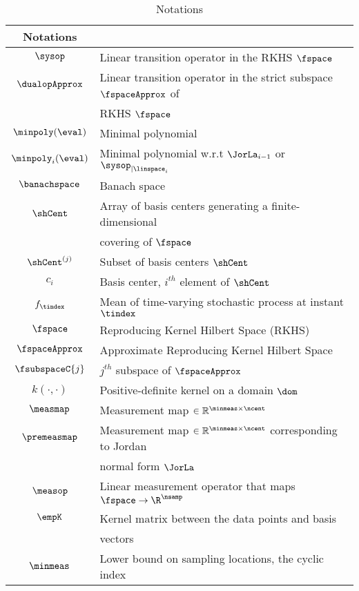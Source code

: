\begin{table}[tbh]\label{table:notation}
	\centering
	\caption{Notations}
	\label{tab}
\begin{tabular}{ cl  }
	\hline
	Notations & \\
	\hline
	$ \sysop $ & Linear transition operator in the RKHS $ \fspace $ \\
	$ \dualopApprox $ & Linear transition operator in the strict subspace $ \fspaceApprox $ of \\
	 & RKHS $ \fspace $ \\
	$ \minpoly(\eval) $ & Minimal polynomial\\ 
	$ \minpoly_i(\eval) $ & Minimal polynomial w.r.t $ \JorLa_{i-1} $ or $ \sysop_{|\linspace_i} $\\
	$\banachspace$ & Banach space\\
	$ \shCent $ & Array of basis centers generating a finite-dimensional \\
	& covering of  $ \fspace $\\
	$ \shCent^{(j)} $ & Subset of basis centers $ \shCent $\\
	$ c_i $ & Basis center, $ i^{th} $ element of $ \shCent $\\
	$f_{\tindex}$ & Mean of time-varying stochastic process at instant $ \tindex $\\
	$ \fspace $ & Reproducing Kernel Hilbert Space (RKHS)\\
	$ \fspaceApprox $ &Approximate Reproducing Kernel Hilbert Space\\
	$ \fsubspaceC{j} $ & $ j^{th} $ subspace of $ \fspaceApprox $\\
	$ k(\cdot,\cdot) $ & Positive-definite kernel on a domain $ \dom $ \\
	$ \measmap $ & Measurement map $ \in \mathbb{R}^{\minmeas \times \ncent} $ \\
	$ \premeasmap $ & Measurement map $ \in \mathbb{R}^{\minmeas \times \ncent} $ corresponding to Jordan \\
	& normal form $ \JorLa $ \\
	$ \measop $ & Linear measurement operator that maps $ \fspace\to\R^{\nsamp} $\\
	$ \empK $ & Kernel matrix between the data points and basis \\
	& vectors\\
	$ \minmeas $ & Lower bound on sampling locations, the cyclic index\\

\end{tabular}
\end{table}

